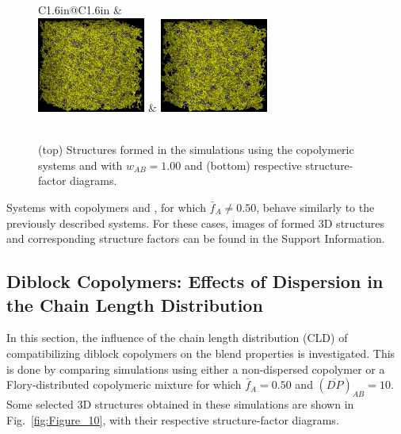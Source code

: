 \documentclass[
aip,
jcp,
reprint,
]{revtex4-1}
\begin{document}
\begin{figure}
	\centering
	\begin{tabular}{C{1.6in}@{}C{1.6in}}
		 \textcolor{white}{ } & \textcolor{white}{ } \\
		 \includegraphics[width=1.4in]{A2B3A3B2_100} & \includegraphics[width=1.4in]{A3B2A2B3_100} \\
		 \\
	\end{tabular}
	\caption{(top) Structures formed in the simulations using the copolymeric systems  and  with $w_{AB}=1.00$ and (bottom) respective structure-factor diagrams.}
	\label{fig:Figure_9}
\end{figure}

Systems with copolymers  and , for which $\bar{f}_A \neq 0.50$, behave similarly to the previously described systems.
For these cases, images of formed 3D structures and corresponding structure factors can be found in the Support Information.

\subsection{Diblock Copolymers: Effects of Dispersion in the Chain Length Distribution}
\label{sec:CLD effects}

In this section, the influence of the chain length distribution (CLD) of compatibilizing diblock copolymers on the blend properties is investigated.
This is done by comparing simulations using either a non-dispersed  copolymer or a Flory-distributed copolymeric mixture for which $\bar{f}_A = 0.50$ and $( \overline{DP} )_{AB} = 10$.
Some selected 3D structures obtained in these simulations are shown in Fig.~\ref{fig:Figure_10}, with their respective structure-factor diagrams.
\end{document}
